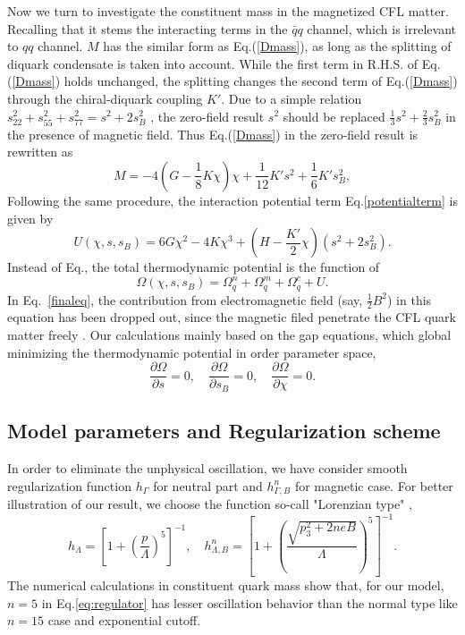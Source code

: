 \documentclass[prd, showpacs,nofootinbib,amsmath,amssymb,12pt]{revtex4}
\begin{document}
Now we turn to investigate the constituent  mass in the magnetized CFL matter.
Recalling that it stems the interacting terms in the $\bar{q}q$ channel, which is irrelevant to
$qq$ channel. $M$ has the similar form as Eq.(\ref{Dmass}), as long as the  splitting of
diquark condensate is taken into account.
While the first term in R.H.S. of  Eq.(\ref{Dmass}) 
holds unchanged, the splitting  changes the second term of Eq.(\ref{Dmass})
through the chiral-diquark coupling $K'$.
Due to  a simple relation $s^2_{22}+s^2_{55}+s^2_{77} = s^2 + 2s_B^2$ , 
the zero-field result $s^2$ should be replaced  $\frac{1}{3}s^2+\frac{2}{3}s^2_{B}$
in the presence of magnetic field.
Thus Eq.(\ref{Dmass}) in the zero-field result is rewritten as
\begin{equation}
M=-4(G-\frac{1}{8}K\chi)\chi+\frac{1}{12}K's^2+\frac{1}{6}K's^2_B,
\end{equation}
Following the same procedure, the interaction potential term Eq.\ref{potentialterm} is given by
\begin{equation}
U(\chi,s,s_B)=6G\chi^2-4K\chi^3+(H-\frac{K'}{2}\chi)(s^2+2s^2_B).
\end{equation}
Instead of Eq., the  total thermodynamic potential is the function of 
\begin{equation}

\Omega(\chi,s,s_B)=\Omega^n_q+\Omega^m_q+\Omega^c_q+U.
\label{finaleq}
\end{equation}
In Eq.~\eqref{finaleq}, the contribution from electromagnetic field (say, $\frac{1}{2}B^2$) in this equation has been dropped out, since the magnetic filed penetrate the CFL quark matter freely \cite{ferrer2005magnetic,  Ferrer2006Color,  ferrer2007magnetic}. 
Our calculations mainly based on the gap equations, which global minimizing the thermodynamic potential in order parameter space,
\begin{equation}
\frac{\partial\Omega}{\partial s} =0,\quad 
\frac{\partial\Omega}{\partial s_B} =0,\quad 
\frac{\partial\Omega}{\partial \chi} =0.
\end{equation}

\subsection{Model parameters and Regularization scheme}
\label{sec:2c}
In order to eliminate the unphysical oscillation, 
we have consider smooth regularization function $h_{\Gamma}$ for neutral part and $h^n_{\Gamma, B}$ for magnetic case.
For better illustration of our result, 
we choose the function so-call "Lorenzian type" \cite{Frasca2011Magnetic},
\begin{equation}\label{eq:regulator}
  h_{\Lambda} = [1+(\frac{p}{\Lambda})^5]^{-1}, \quad  h^n_{\Lambda,B}=[1+(\frac{\sqrt{p_3^2 + 2neB}}{\Lambda})^5]^{-1}.
\end{equation}
The numerical calculations in constituent quark mass show that, for our model, $n=5$ in Eq.\eqref{eq:regulator} 
has lesser oscillation behavior than the normal type like $n=15$ case and exponential cutoff.
\end{document}
